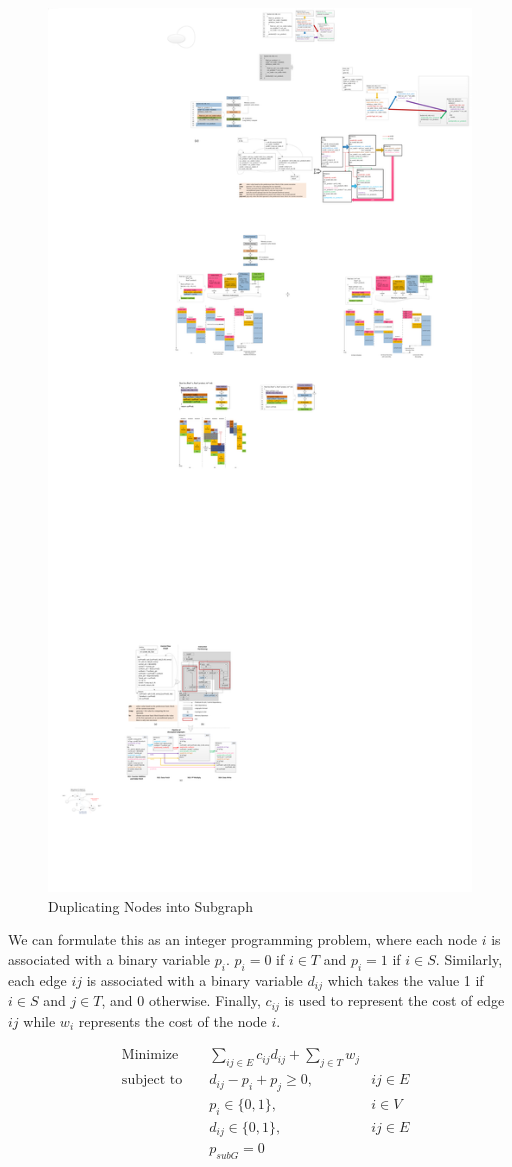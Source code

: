 \begin{figure}[htp]
\begin{center}
\includegraphics[width=0.65\linewidth]{chap3fig/graphCut.pdf}
\caption{Duplicating Nodes into Subgraph 
\label{fig:gc}}
\end{center}
\end{figure}

We can formulate this as an integer programming problem, where
each node $i$ is associated with a binary variable $p_i$. $p_i = 0$ if $i \in T$
and $p_i = 1$ if $i \in S$. Similarly, each edge $ij$ is associated with
a binary variable $d_{ij}$ which takes the value 1 if $i \in S$ and $j \in T$, and 0 otherwise. Finally, $c_{ij}$ is used to represent the cost of edge $ij$
while $w_i$ represents the cost of the node $i$.


\begin{equation*}
\begin{aligned}
\label{ilpopt}
& {\text{Minimize}} & & \underset{ij \in E}\sum c_{ij}d_{ij} +  \underset{j \in T}\sum w_j \\
& \text{subject to }
& & d_{ij} - p_i+p_j \ge 0, & ij \in E \\
& &  & p_i \in \{0,1\}, & i \in V \\
& & & d_{ij} \in \{0,1\}, & ij \in E \\
& & & p_{subG} = 0
\end{aligned}
\end{equation*}



